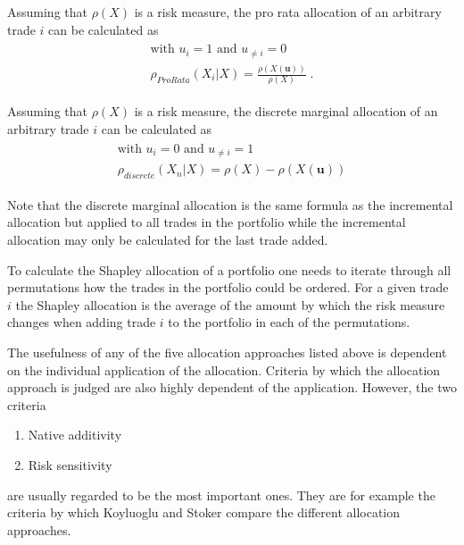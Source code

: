 \documentclass[../Thesis_AHoecherl.tex]{subfiles}
\begin{document}
\begin{definition}
    Assuming that $\rho\left(X\right)$ is a risk measure, the pro rata allocation of an arbitrary trade $i$ can be calculated as
    \begin{gather}
        \begin{split}
            \text{with } u_{i} = 1 \text{ and } u_{\neq i} = 0\\
            \rho_{ProRata}\left(X_i|X\right) = \frac{\rho(X(\mathbf{u}))}{\rho(X)} \; \text{.}
        \end{split}
    \end{gather}
\end{definition}

\begin{definition} 
    Assuming that $\rho(X)$ is a risk measure, the discrete marginal allocation of an arbitrary trade $i$ can be calculated as
    \begin{gather}
        \begin{split}
            \text{with } u_{i} = 0 \text{ and } u_{\neq i} = 1\\
            \rho_{discrete}\left(X_n|X\right) = \rho\left(X\right) - \rho\left(X\left(\mathbf{u}\right)\right)    
        \end{split}
    \end{gather}
\end{definition}

Note that the discrete marginal allocation is the same formula as the incremental allocation but applied to all trades in the portfolio while the incremental allocation may only be calculated for the last trade added.

\begin{definition}
To calculate the Shapley allocation of a portfolio one needs to iterate through all permutations how the trades in the portfolio could be ordered.
For a given trade $i$ the Shapley allocation is the average of the amount by which the risk measure changes when adding trade $i$ to the portfolio in each of the permutations.
\end{definition}

The usefulness of any of the five allocation approaches listed above is dependent on the individual application of the allocation. Criteria by which the allocation approach is judged are also highly dependent of the application. However, the two criteria
\begin{enumerate}
    \item Native additivity
    \item Risk sensitivity
\end{enumerate}
are usually regarded to be the most important ones. They are for example the criteria by which Koyluoglu and Stoker \cite{koyluoglu2002risk} compare the different allocation approaches.
\end{document}
